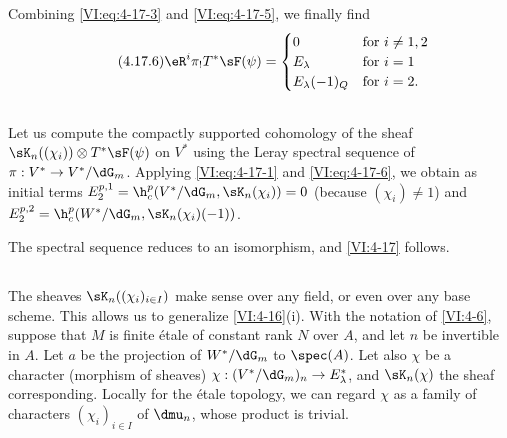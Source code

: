 Combining \eqref{VI:eq:4-17-3} and \eqref{VI:eq:4-17-5}, we finally find 
\begin{equation*}\tag{4.17.6}\label{VI:eq:4-17-6}
  \eR^i \pi_! T^\ast\sF(\psi) = 
    \begin{cases}
      0 & \text{for $i\ne 1,2$} \\
      E_\lambda & \text{for $i=1$} \\
      E_\lambda(-1)_Q & \text{for $i=2$.} 
    \end{cases}
\end{equation*}





\subsection{}\label{VI:4-18}

Let us compute the compactly supported cohomology of the sheaf 
$\sK_n((\chi_i))\otimes T^\ast \sF(\psi)$ on $V^\ast$ using the 
Leray spectral sequence of $\pi:V^\ast\to V^\ast/\dG_m$. Applying 
\eqref{VI:eq:4-17-1} and \eqref{VI:eq:4-17-6}, we obtain as initial terms 
$E_2^{p,1} = \h_c^p(V^\ast/\dG_m,\sK_n(\chi_i)) = 0$ (because $(\chi_i)\ne 1$) 
and $E_2^{p,2} = \h_c^p(W^\ast/\dG_m,\sK_n(\chi_i)(-1))$. 

The spectral sequence reduces to an isomorphism, and \ref{VI:4-17} follows. 





\subsection{}\label{VI:4-19}

The sheaves $\sK_n((\chi_i)_{i\in I})$ make sense over any field, 
or even over any base scheme. This allows us to generalize 
\ref{VI:4-16}(i). With the notation of \ref{VI:4-6}, suppose that $M$ is finite 
étale of constant rank $N$ over $A$, and let $n$ be invertible in $A$. 
Let $a$ be the projection of $W^\ast/\dG_m$ to $\spec(A)$. Let also $\chi$ be 
a character (morphism of sheaves) 
$\chi:(V^\ast/\dG_m)_n \to E_\lambda^\ast$, and $\sK_n(\chi)$ the sheaf 
corresponding. Locally for the étale topology, we can regard $\chi$ 
as a family of characters $(\chi_i)_{i\in I}$ of $\dmu_n$, whose product is 
trivial.

